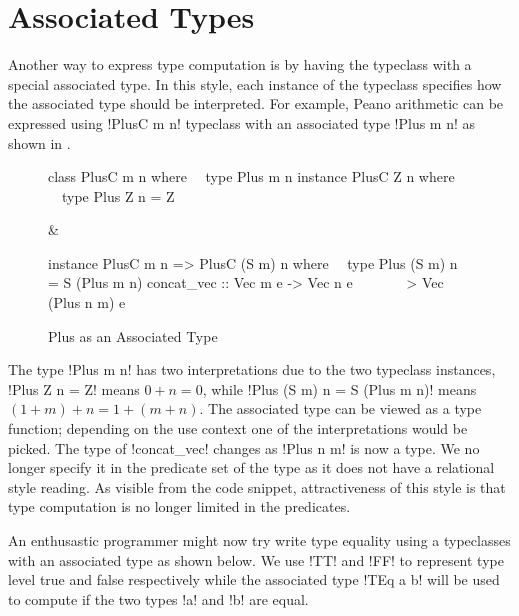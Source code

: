 \documentclass[format=acmsmall,manuscript,review,screen,nonacm,margin=1in,11pt]{acmart}
\begin{document}
\section{Associated Types}\label{sec:assoc-types}
Another way to express type computation is by having the typeclass with
a special associated type\cite{chakravarty_associated_2005}.
In this style, each instance of the typeclass specifies how the associated type should be interpreted.
For example, Peano arithmetic can be expressed using !PlusC m n! typeclass with an associated type
!Plus m n! as shown in .
\begin{figure}[ht]\centering
  \footnotesize
  \begin{tabularx}\textwidth{X X}
\begin{code}^^J
class PlusC m n where^^J
\ \ type Plus m n^^J
^^J
instance PlusC Z n where^^J
\ \ type Plus Z n = Z^^J
\end{code}&%
\begin{code}^^J
instance PlusC m n => PlusC (S m) n where^^J
\ \  type Plus (S m) n = S (Plus m n)^^J
^^J
concat_vec :: Vec m e -> Vec n e^^J
\ \ \ \ \ \ \ \-> Vec (Plus n m) e^^J
\end{code}
  \end{tabularx}
  \caption{Plus as an Associated Type}
  \label{fig:plus-assoc-type}
\end{figure}

The type !Plus m n! has two interpretations due to the two typeclass instances,
!Plus Z n  = Z! means $0 + n = 0$, while !Plus (S m) n = S (Plus m n)! means $(1 + m) + n = 1 + (m + n)$. 
The associated type can be viewed as a type function; depending on the use context
one of the interpretations would be picked.
The type of !concat_vec! changes as !Plus n m! is now a type.
We no longer specify it in the predicate set of the type as it does not have a relational style reading.
As visible from the code snippet, attractiveness of this style is that type computation is
no longer limited in the predicates.

An enthusastic programmer might now try write type equality
using a typeclasses with an associated type as shown below.
We use !TT! and !FF! to represent type level true and false respectively while
the associated type !TEq a b! will be used to compute if the two types !a! and !b! are equal.
\end{document}
